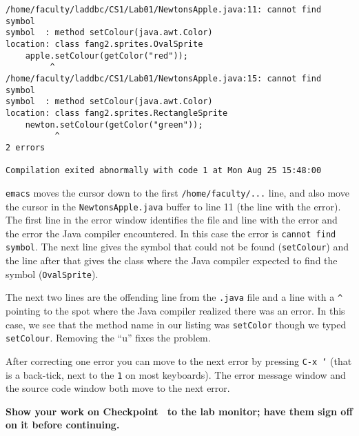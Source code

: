 \documentclass[12pt,twoside]{memoir}
\begin{document}
\begin{Exercise}[name={Checkpoint},title={Continue the program.}]
\begin{lstlisting}[numbers=none]
/home/faculty/laddbc/CS1/Lab01/NewtonsApple.java:11: cannot find symbol
symbol  : method setColour(java.awt.Color)
location: class fang2.sprites.OvalSprite
    apple.setColour(getColor("red"));
         ^
/home/faculty/laddbc/CS1/Lab01/NewtonsApple.java:15: cannot find symbol
symbol  : method setColour(java.awt.Color)
location: class fang2.sprites.RectangleSprite
    newton.setColour(getColor("green"));
          ^
2 errors

Compilation exited abnormally with code 1 at Mon Aug 25 15:48:00  
\end{lstlisting}

\texttt{emacs} moves the cursor down to the first
\texttt{/home/faculty/...} line, and also move the cursor in the
\texttt{NewtonsApple.java} buffer to line 11 (the line with the
error). The first line in the error window identifies the file and
line with the error and the error the Java compiler encountered. In
this case the error is \texttt{cannot find symbol}. The next line gives
the symbol that could not be found (\texttt{setColour}) and the line
after that gives the class where the Java compiler expected to find
the symbol (\texttt{OvalSprite}). 

The next two lines are the offending line from the \texttt{.java} file
and a line with a \texttt{\^} pointing to the spot where the Java
compiler realized there was an error. In this case, we see that the
method name in our listing was \texttt{setColor} though we typed
\texttt{setColour}. Removing the ``u'' fixes the problem.

After correcting one error you can move to the next error by
pressing \texttt{C-x `} (that is a back-tick, next to the \texttt{1} on
most keyboards).  The error message window and the source code window
both move to the next error.
\end{Exercise}
\noindent
\textbf{Show your work on Checkpoint~\theExercise{} to the lab monitor;
  have them sign off on it before continuing.}
\end{document}
